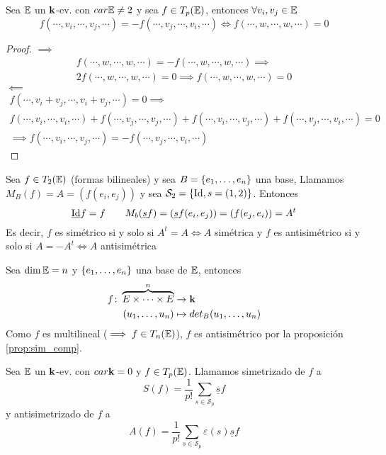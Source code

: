 \begin{prop}
    Sea $\mathbb{E}$ un $\mathbf{k}$-ev. con $car \mathbb{E} \neq 2$ y sea $f \in T_p(\mathbb{E})$, entonces $\forall v_i, v_j \in \mathbb{E}$
    \[
        f(\cdots, v_i, \cdots, v_j, \cdots) = -f(\cdots,v_j,\cdots,v_i,\cdots) \iff
        f(\cdots, w, \cdots, w, \cdots) = 0
    \]
\end{prop}
\begin{proof}
    $\implies$
    \begin{gather*}
        f(\cdots,w,\cdots,w,\cdots) = - f(\cdots,w,\cdots,w,\cdots) \implies \\
        2f(\cdots,w,\cdots,w,\cdots) = 0 \implies f(\cdots,w,\cdots,w,\cdots) = 0
    \end{gather*}
    $\impliedby$
    \begin{gather*}
        f(\cdots, v_i+v_j, \cdots, v_i+v_j, \cdots) = 0 \implies \\
        f(\cdots,v_i,\cdots,v_i,\cdots) + f(\cdots,v_j,\cdots,v_j,\cdots) +
        f(\cdots,v_i,\cdots,v_j,\cdots) + f(\cdots,v_j,\cdots,v_i,\cdots) = 0 \\
        \implies f(\cdots,v_i,\cdots,v_j,\cdots) = -f(\cdots,v_j,\cdots,v_i,\cdots)
    \end{gather*}
\end{proof}
\begin{example}
    Sea $f \in T_2(\mathbb{E})$ (formas bilineales) y sea $B = \left\{e_1,\dots,e_n\right\}$ una base,
    Llamamos $M_B(f) = A = \left( f(e_i,e_j) \right)$ y sea $\mathcal{S}_2 = \left\{\operatorname{Id}, s=(1,2)\right\}$.
    Entonces
    \[
        \underline{\operatorname{Id}}f = f \qquad M_b(\underline{s}f)= \left( \underline{s}f(e_i,e_j) \right)
        = \left( f(e_j,e_i) \right) = A^t
    \]
    Es decir, $f$ es simétrico si y solo si $A^t = A \iff A$ simétrica y $f$ es
    antisimétrico si y solo si $A = -A^t \iff A$ antisimétrica
\end{example}
\begin{example}
    Sea $\dim \mathbb{E} = n$ y $\left\{e_1,\dots,e_n\right\}$ una base de $\mathbb{E}$, entonces
    \[
        \begin{aligned}
            f \colon \overbrace{E \times \cdots \times E}^n &\to \mathbf{k} \\
            (u_1,\dots,u_n) &\mapsto det_B(u_1,\dots,u_n)
        \end{aligned}
    \]
    Como $f$ es multilineal ($\implies f \in T_n(\mathbb{E})$), $f$ es antisimétrico
    por la proposición \ref{prop:sim_comp}.
\end{example}
\begin{defi}
    Sea $\mathbb{E}$ un $\mathbf{k}$-ev. con $car \mathbf{k} = 0$ y $f \in T_p(\mathbb{E})$. Llamamos simetrizado de $f$ a
    \[
        S(f) = \frac{1}{p!}\sum_{s \in \mathcal{S}_p} \underline{s}f
    \]
    y antisimetrizado de $f$ a
    \[
        A(f) = \frac{1}{p!}\sum_{s \in \mathcal{S}_p} \varepsilon(s)\underline{s}f
    \]
\end{defi}
